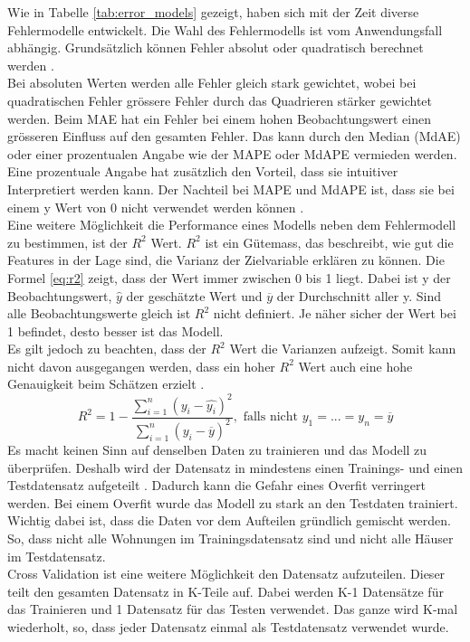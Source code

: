 %
Wie in Tabelle \ref{tab:error_models} gezeigt, haben sich mit der Zeit diverse Fehlermodelle entwickelt. Die Wahl des Fehlermodells ist vom Anwendungsfall abhängig. Grundsätzlich können Fehler absolut oder quadratisch berechnet werden \cite{error_models}.\\
Bei absoluten Werten werden alle Fehler gleich stark gewichtet, wobei bei quadratischen Fehler grössere Fehler durch das Quadrieren stärker gewichtet werden. Beim MAE hat ein Fehler bei einem hohen Beobachtungswert einen grösseren Einfluss auf den gesamten Fehler. Das kann durch den Median (MdAE) oder einer prozentualen Angabe wie der MAPE oder MdAPE vermieden werden. Eine prozentuale Angabe hat zusätzlich den Vorteil, dass sie intuitiver Interpretiert werden kann. Der Nachteil bei MAPE und MdAPE ist, dass sie bei einem y Wert von 0 nicht verwendet werden können \cite{error_models_2}.\\[2ex]
%
Eine weitere Möglichkeit die Performance eines Modells neben dem Fehlermodell zu bestimmen, ist der $R^2$ Wert. $R^2$ ist ein Gütemass, das beschreibt, wie gut die Features in der Lage sind, die Varianz der Zielvariable erklären zu können. Die Formel \eqref{eq:r2} zeigt, dass der Wert immer zwischen 0 bis 1 liegt. Dabei ist y der Beobachtungswert, $\hat{y}$ der geschätzte Wert und $\overline{y}$ der Durchschnitt aller y. Sind alle Beobachtungswerte gleich ist $R^2$ nicht definiert. Je näher sicher der Wert bei 1 befindet, desto besser ist das Modell.\\
Es gilt jedoch zu beachten, dass der $R^2$ Wert die Varianzen aufzeigt. Somit kann nicht davon ausgegangen werden, dass ein hoher $R^2$ Wert auch eine hohe Genauigkeit beim Schätzen erzielt \cite{r2, r2_2}.
\begin{equation}
\label{eq:r2}
R^2 = 1 - \frac{\sum_{i=1}^{n} (y_i - \hat{y_i})^2}{\sum_{i=1}^{n}(y_i - \overline{y})^2},\text{ falls nicht }y_1  = ... = y_n = \overline{y}
\end{equation}
%
Es macht keinen Sinn auf denselben Daten zu trainieren und das Modell zu überprüfen. Deshalb wird der Datensatz in mindestens einen Trainings- und einen Testdatensatz aufgeteilt \cite{cross_validation}.
Dadurch kann die Gefahr eines Overfit verringert werden. Bei einem Overfit wurde das Modell zu stark an den Testdaten trainiert. Wichtig dabei ist, dass die Daten vor dem Aufteilen gründlich gemischt werden. So, dass nicht alle Wohnungen im Trainingsdatensatz sind und nicht alle Häuser im Testdatensatz.\\
Cross Validation ist eine weitere Möglichkeit den Datensatz aufzuteilen. Dieser teilt den gesamten Datensatz in K-Teile auf. Dabei werden K-1 Datensätze für das Trainieren und 1 Datensatz für das Testen verwendet. Das ganze wird K-mal wiederholt, so, dass jeder Datensatz einmal als Testdatensatz verwendet wurde.
%
